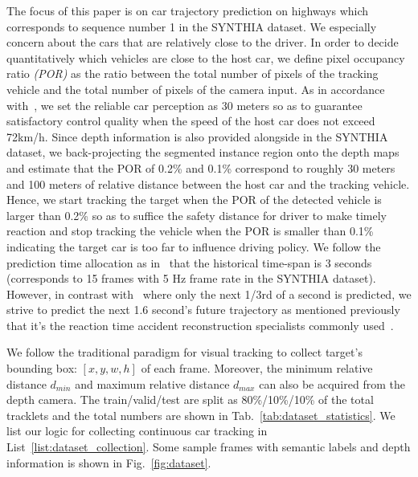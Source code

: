 \documentclass[10pt,twocolumn,letterpaper]{article}
\begin{document}
The focus of this paper is on car trajectory prediction on highways which corresponds to sequence number 1 in the SYNTHIA dataset. We especially concern about the cars that are relatively close to the driver.
In order to decide quantitatively which vehicles are close to the host car, we define pixel occupancy ratio \emph{(POR)} as the ratio between the total number of pixels of the tracking vehicle and the total number of pixels of the camera input.
As in accordance with~\cite{chen2015deepdriving}, we set the reliable car perception as 30 meters so as to guarantee satisfactory control quality when the speed of the host car does not exceed 72km/h.
Since depth information is also provided alongside in the SYNTHIA dataset, we back-projecting the segmented instance region onto the depth maps and estimate that the POR of 0.2\% and 0.1\% correspond to roughly 30 meters and 100 meters of relative distance between the host car and the tracking vehicle.
Hence, we start tracking the target when the POR of the detected vehicle is larger than 0.2\%  so as to suffice the safety distance for driver to make timely reaction and stop tracking the vehicle when the POR is smaller than 0.1\% indicating the target car is too far to influence driving policy.
We follow the prediction time allocation as in~\cite{xu2017end} that the historical time-span is 3 seconds (corresponds to 15 frames with 5 Hz frame rate in the SYNTHIA dataset).
However, in contrast with~\cite{xu2017end} where only the next 1/3rd of a second is predicted, we strive to predict the next 1.6 second's future trajectory as mentioned previously that it's the reaction time accident reconstruction specialists commonly used~\cite{mcgehee2000driver}.

We follow the traditional paradigm for visual tracking to collect target's bounding box: $[x, y, w, h]$ of each frame. Moreover, the minimum relative distance $d_{min}$ and maximum relative distance $d_{max}$ can also be acquired from the depth camera. The train/valid/test are split as 80\%/10\%/10\% of the total tracklets and the total numbers are shown in Tab.~\ref{tab:dataset_statistics}.
We list our logic for collecting continuous car tracking in List~\ref{list:dataset_collection}.
Some sample frames with semantic labels and depth information is shown in Fig.~\ref{fig:dataset}.



\end{document}
